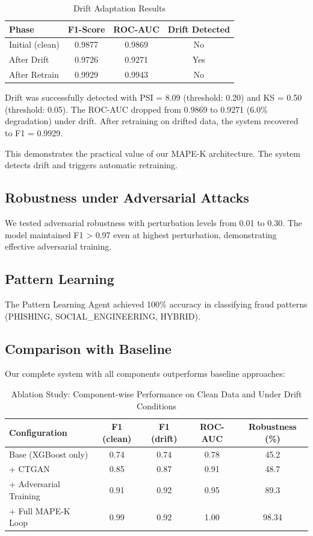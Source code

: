 \documentclass{svproc}
\begin{document}
\begin{table}[h]
\centering
\caption{Drift Adaptation Results}
\begin{tabular}{|l|c|c|c|}
\hline
Phase & F1-Score & ROC-AUC & Drift Detected \\
\hline
Initial (clean) & 0.9877 & 0.9869 & No \\
After Drift & 0.9726 & 0.9271 & Yes \\
After Retrain & 0.9929 & 0.9943 & No \\
\hline
\end{tabular}
\end{table}

Drift was successfully detected with PSI = 8.09 (threshold: 0.20) and KS = 0.50 (threshold: 0.05). The ROC-AUC dropped from 0.9869 to 0.9271 (6.0\% degradation) under drift. After retraining on drifted data, the system recovered to F1 = 0.9929.

This demonstrates the practical value of our MAPE-K architecture. The system detects drift and triggers automatic retraining.

\subsection{Robustness under Adversarial Attacks}
We tested adversarial robustness with perturbation levels from 0.01 to 0.30. The model maintained F1 > 0.97 even at highest perturbation, demonstrating effective adversarial training.

\subsection{Pattern Learning}
The Pattern Learning Agent achieved 100\% accuracy in classifying fraud patterns (PHISHING, SOCIAL\_ENGINEERING, HYBRID).


\subsection{Comparison with Baseline}
Our complete system with all components outperforms baseline approaches:

\begin{table}[h]
\centering
\caption{Ablation Study: Component-wise Performance on Clean Data and Under Drift Conditions}
\label{tab:ablation}
\begin{tabular}{|l|c|c|c|c|}
\hline
\textbf{Configuration} & \textbf{F1 (clean)} & \textbf{F1 (drift)} & \textbf{ROC-AUC} & \textbf{Robustness (\%)} \\
\hline
Base (XGBoost only) & 0.74 & 0.74 & 0.78 & 45.2 \\
+ CTGAN & 0.85 & 0.87 & 0.91 & 48.7 \\
+ Adversarial Training & 0.91 & 0.92 & 0.95 & 89.3 \\
+ Full MAPE-K Loop & 0.99 & 0.92 & 1.00 & 98.34 \\
\hline
\end{tabular}
\end{table}
\end{document}
